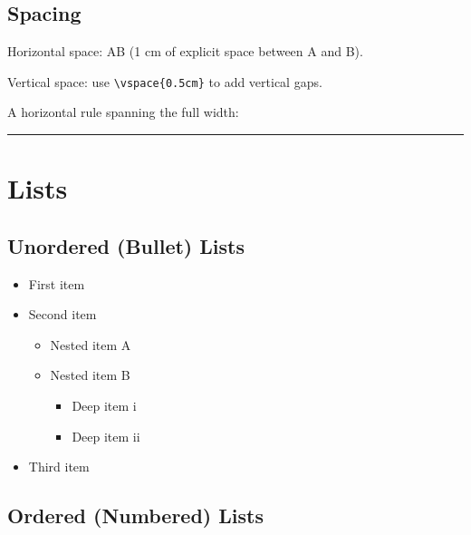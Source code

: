 \documentclass[12pt, a4paper]{article}
\theoremstyle{definition}
\theoremstyle{plain}
\theoremstyle{remark}
\begin{document}
\subsection{Spacing}

Horizontal space: A\hspace{1cm}B \quad (1 cm of explicit space between A and B).

Vertical space: use \verb|\vspace{0.5cm}| to add vertical gaps.

\vspace{0.4cm}

\noindent A horizontal rule spanning the full width:

\noindent\rule{\linewidth}{0.4pt}


\section{Lists}
\label{sec:lists}

\subsection{Unordered (Bullet) Lists}

\begin{itemize}
  \item First item
  \item Second item
    \begin{itemize}               %
      \item Nested item A
      \item Nested item B
        \begin{itemize}           %
          \item Deep item i
          \item Deep item ii
        \end{itemize}
    \end{itemize}
  \item Third item
\end{itemize}

\subsection{Ordered (Numbered) Lists}
\end{document}
